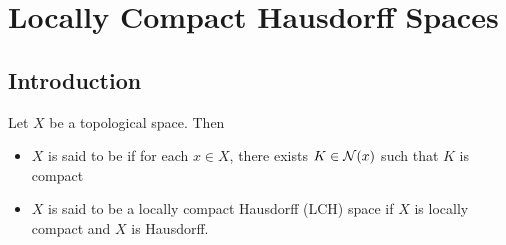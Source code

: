 \documentclass{book}
\begin{document}
 
 
 
 
 
 
 
 
 
 
 
 
 
 
 
 
 
 
 
 
 
 
 
 
 
 
 
 
 
 
 
 
 
 

 
 
 
 
 
 
 
 
 
 
 
 
 
 
 
 
 
 
 
 
 
 
 
 
 
 
 
 
 
 
 
 
 
 
 
 
 
 
 
 	\newpage
 \section{Locally Compact Hausdorff Spaces}
 
 \subsection{Introduction}
 
 \begin{defn}
 	Let $X$ be a topological space. Then 
 	\begin{itemize}
 		\item $X$ is said to be  if for each $x \in X$, there exists $K \in \mathcal{N}(x)$ such that $K$ is compact
 		\item $X$ is said to be a locally compact Hausdorff (LCH) space if $X$ is locally compact and $X$ is Hausdorff. 
 	\end{itemize} 
 \end{defn}
\end{document}
